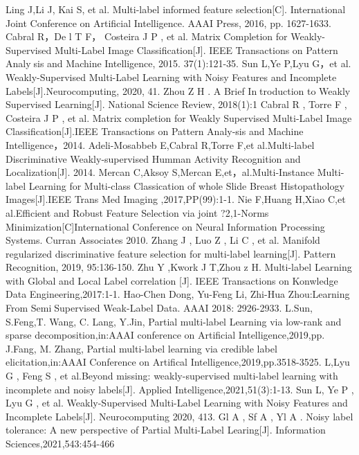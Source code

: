 \documentclass[final,3p,times]{elsarticle}
\begin{document}
{         Ling J,Li J, Kai S, et al. Multi-label informed feature selection[C]. International Joint Conference on Artificial Intelligence. AAAI Press, 2016, pp. 1627-1633.
         Cabral R，De l T F， Costeira J P , et al. Matrix Completion for Weakly-Supervised Multi-Label Image Classification[J]. IEEE Transactions on Pattern Analysis and Machine Intelligence, 2015. 37(1):121-35. 
         Sun L,Ye P,Lyu G，et al. Weakly-Supervised Multi-Label Learning with Noisy Features and Incomplete Labels[J].Neurocomputing, 2020, 41.
         Zhou Z H . A Brief Introduction to Weakly Supervised Learning[J]. National Science Review, 2018(1):1
         Cabral R , Torre F , Costeira J P , et al. Matrix completion for Weakly Supervised Multi-Label Image Classification[J].IEEE Transactions on Pattern Analy-sis and Machine Intelligence，2014.
         Adeli-Mosabbeb E,Cabral R,Torre F,et al.Multi-label Discriminative Weakly-supervised Humman Activity Recognition and Localization[J]. 2014.
         Mercan C,Aksoy S,Mercan E,et，al.Multi-Instance Multi-label Learning for Multi-class Classication of whole Slide Breast Histopathology Images[J].IEEE Trans Med Imaging ,2017,PP(99):1-1.
         Nie F,Huang H,Xiao C,et al.Efficient and Robust Feature Selection via joint ?2,1-Norms Minimization[C]International Conference on Neural Information Processing Systems. Curran Associates        2010. 
         Zhang J , Luo Z , Li C , et al. Manifold regularized discriminative feature selection for multi-label learning[J]. Pattern Recognition, 2019, 95:136-150.
         Zhu Y ,Kwork J T,Zhou z H. Multi-label Learning with Global and Local Label correlation [J]. IEEE Transactions on Konwledge Data Engineering,2017:1-1.
         Hao-Chen Dong, Yu-Feng Li, Zhi-Hua Zhou:Learning From SemiSupervised Weak-Label Data. AAAI 2018: 2926-2933. 
         L.Sun, S.Feng,T. Wang, C. Lang, Y.Jin, Partial multi-label Learning via low-rank and sparse decomposition,in:AAAI conference on Artificial Intelligence,2019,pp.
         J.Fang, M. Zhang, Partial multi-label learning via credible label elicitation,in:AAAI Conference on Artifical Intelligence,2019,pp.3518-3525.
         L,Lyu G , Feng S , et al.Beyond missing: weakly-supervised multi-label learning with incomplete and noisy labels[J]. Applied Intelligence,2021,51(3):1-13.
         Sun L, Ye P , Lyu G , et al. Weakly-Supervised Multi-Label Learning with Noisy Features and Incomplete Labels[J]. Neurocomputing 2020, 413.
         Gl A , Sf A , Yl A . Noisy label tolerance: A new perspective of Partial Multi-Label Learing[J]. Information Sciences,2021,543:454-466 
}
\end{document}
